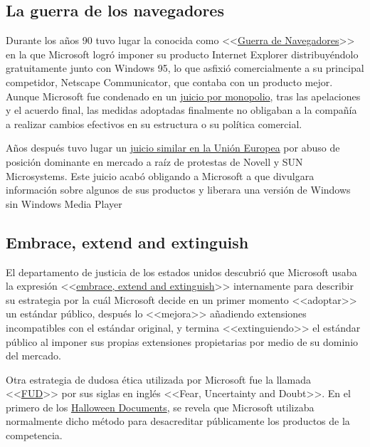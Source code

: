 \subsection{La guerra de los navegadores}
Durante los años 90 tuvo lugar la conocida como <<\href{https://es.wikipedia.org/wiki/guerra_de_navegadores}{Guerra de Navegadores}>>\cite{wiki:guerra_navegadores_2020} en la que Microsoft logró imponer su producto Internet Explorer distribuyéndolo gratuitamente junto con Windows 95, lo que asfixió comercialmente a su principal competidor, Netscape Communicator, que contaba con un producto mejor. Aunque Microsoft fue condenado en un \href{https://es.wikipedia.org/wiki/Caso_Estados_Unidos_contra_Microsoft}{juicio por monopolio}\cite{wiki:juicio_microsoft_2020}, tras las apelaciones y el acuerdo final, las medidas adoptadas finalmente no obligaban a la compañía a realizar cambios efectivos en su estructura o su política comercial.\cite{thotw_2019:Browser_Wars}

Años después tuvo lugar un \href{https://en.wikipedia.org/wiki/Microsoft_Corp._v._Commission}{juicio similar en la Unión Europea}\cite{wiki_2020:microsoft_v_commision} por abuso de posición dominante en mercado a raíz de protestas de Novell y SUN Microsystems. Este juicio acabó obligando a Microsoft a que divulgara información sobre algunos de sus productos y liberara una versión de Windows sin Windows Media Player

\subsection{Embrace, extend and extinguish}
El departamento de justicia de los estados unidos descubrió que Microsoft usaba la expresión <<\href{https://en.wikipedia.org/wiki/Embrace,_extend,_and_extinguish}{embrace, extend and extinguish}>> internamente para describir su estrategia por la cuál Microsoft decide en un primer momento <<adoptar>> un estándar público, después lo <<mejora>> añadiendo extensiones incompatibles con el estándar original, y termina <<extinguiendo>> el estándar público al imponer sus propias extensiones propietarias por medio de su dominio del mercado.\cite{wiki_2020:embrace_extend_extinguish}

\label{par:FUD}
Otra estrategia de dudosa ética utilizada por Microsoft fue la llamada <<\href{https://en.wikipedia.org/wiki/Fear,_uncertainty,_and_doubt}{FUD}>> por sus siglas en inglés <<Fear, Uncertainty and Doubt>>\cite{wiki_2020:FUD}. En el primero de los \href{https://en.wikipedia.org/wiki/Halloween_documents}{Halloween Documents}\cite{wiki_2020:halloween_documents}, se revela que Microsoft utilizaba normalmente dicho método para desacreditar públicamente los productos de la competencia.